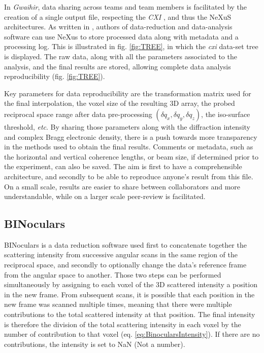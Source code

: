 In \textit{Gwaihir}, data sharing across teams and team members is facilitated by the creation of a single output file, respecting the \textit{CXI} \cite{Maia2012}, and thus the NeXuS \cite{Konnecke2015} architectures.
As written in \cite{Konnecke2015}, authors of data-reduction and data-analysis software can use NeXus to store processed data along with metadata and a processing log.
This is illustrated in fig. \ref{fig:TREE}, in which the \textit{cxi} data-set tree is displayed.
The raw data, along with all the parameters associated to the analysis, and the final results are stored, allowing complete data analysis reproducibility (fig. \ref{fig:TREE}).

Key parameters for data reproducibility are the transformation matrix used for the final interpolation, the voxel size of the resulting 3D array, the probed reciprocal space range after data pre-processing $(\delta q_x , \delta q_y , \delta q_z)$, the iso-surface threshold, \textit{etc}.
By sharing those parameters along with the diffraction intensity and complex Bragg electronic density, there is a push towards more transparency in the methods used to obtain the final results.
Comments or metadata, such as the horizontal and vertical coherence lengths, or beam size, if determined prior to the experiment, can also be saved.
The aim is first to have a comprehensible architecture, and secondly to be able to reproduce anyone's result from this file.
On a small scale, results are easier to share between collaborators and more understandable, while on a larger scale peer-review is facilitated.

\subsection{BINoculars} \label{sec:BINoculars}

BINoculars \parencite{Roobol2015} is a data reduction software used first to concatenate together the scattering intensity from successive angular scans in the same region of the reciprocal space, and secondly to optionally change the data's reference frame from the angular space to another.
Those two steps can be performed simultaneously by assigning to each voxel of the 3D scattered intensity a position in the new frame.
From subsequent scans, it is possible that each position in the new frame was scanned multiple times, meaning that there were multiple contributions to the total scattered intensity at that position.
The final intensity is therefore the division of the total scattering intensity in each voxel by the number of contribution to that voxel (eq. \ref{eq:BinocularsIntensity}).
If there are no contributions, the intensity is set to NaN (Not a number).

